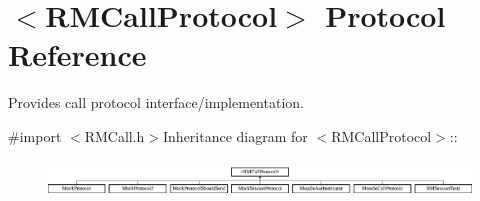 \hypertarget{protocol_r_m_call_protocol-p}{
\section{$<$RMCallProtocol$>$ Protocol Reference}
\label{protocol_r_m_call_protocol-p}
}


Provides call protocol interface/implementation.  


{\ttfamily \#import $<$RMCall.h$>$}Inheritance diagram for $<$RMCallProtocol$>$::\begin{figure}[H]
\begin{center}
\leavevmode
\includegraphics[height=0.963855cm]{protocol_r_m_call_protocol-p}
\end{center}
\end{figure}
